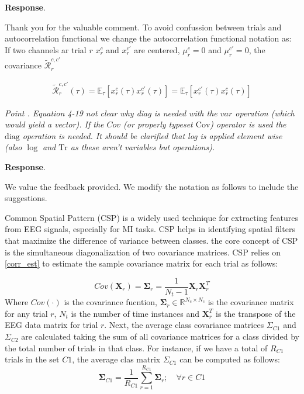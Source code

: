 \documentclass[runningheads]{llncs}
\newcommand{\Real}{\mathbb{R}}
\newcommand{\mat}[1]{\bm {#1}}
\newenvironment{reviewer}{\setcounter{pointcounter}{1}}{}
\newcommand{\changes}[1]{\textcolor[rgb]{1.00,0.00,0.00}{#1}}
\newcommand{\point}[1]{\medskip \noindent
  \textsl{{\fontseries{b}\selectfont Point \thepointcounter}.
\stepcounter{pointcounter} #1}}
\newcommand{\reply}{\medskip \noindent \textbf{Response}.\ }
\begin{document}
\begin{reviewer}
  \reply{
    Thank you for the valuable comment. To avoid confussion between
    trials and autocorrelation functional we change the
    autocorrelation functional notation as:
    \changes{If two channels ar trial $r$ $x^{c}_{r}$ and
      $x^{c'}_{r}$ are centered, $\mu^{c}_{r}=0$ and $\mu^{c'}_{r}=0$,
    the covariance $\mathcal{\tilde{R}}^{c, c'}_{r}$}

    \changes{
      \begin{equation}
        \begin{split}
          \mathcal{\tilde{R}}^{c, c'}_{r}(\tau) = \mathbb{E}_{\tau}
          \left[ x^{c}_{r}(\tau) x^{c'}_{r}(\tau)  \right] =
          \mathbb{E}_{\tau} \left[ x^{c'}_{r}(\tau) x^{c}_{r}(\tau) \right]
        \end{split}
      \end{equation}
    }

  }

  \point{Equation 4-19 not clear why diag is needed with the $var$
    operation (which would yield a vector). If the $Cov$ (or properly
    typeset $\mathrm{Cov}$) operator is used the $\mathrm{diag}$
    operation is needed.   It should be clarified that log is applied
    element wise (also $\log$ and $\mathrm{Tr}$ as these aren't
  variables but operations). }

  \reply{
    We value the feedback provided. We modify the notation as follows
    to include the suggestions.

    \changes{
      Common Spatial Pattern (CSP) is a widely used technique for
      extracting features from EEG signals, especially for MI tasks.
      CSP helps in identifying spatial filters that maximize the
      difference of variance between classes. the core concept of CSP
      is the simultaneous diagonalization of two covariance matrices.
      CSP relies on \cref{corr_est} to estimate the sample covariance
    matrix for each trial as follows:}

    \changes{
      \begin{equation}
        Cov(\mat{X}_r) = \mat{\Sigma}_{r} = \frac{1}{N_{t}-1}
        \mat{X}_r \mat{X}_{r}^T
      \end{equation}
    }
    \changes{
      Where $Cov(\cdot)$ is the covariance fucntion,
      $\mat{\Sigma}_{r} \in \Real^{N_c \times N_c}$ is the covariance
      matrix for any trial $r$, $N_{t}$ is the number of time
      instances and $\mat{X}_{r}^{T}$ is the transpose of the EEG
      data matrix for trial $r$.
    }
    \changes{
      Next, the average class covariance matrices $\Sigma_{C1}$ and
      $\Sigma_{C2}$ are calculated taking the sum of all covariance
      matrices for a class  divided by the total number of trials in
      that class. For instance, if we have a total of $R_{C1}$ trials
      in the set $C1$, the average clas matrix $\Sigma_{C1}$ can be
      computed as follows:
    }
    \changes{
      \begin{equation}
        \mat{\Sigma}_{C1} = \frac{1}{R_{C1}} \sum_{{r}=1}^{R_{C1}}
        \mat{\Sigma}_{r};\quad \forall r \in C1
      \end{equation}
    }

}
\end{reviewer}
\end{document}
